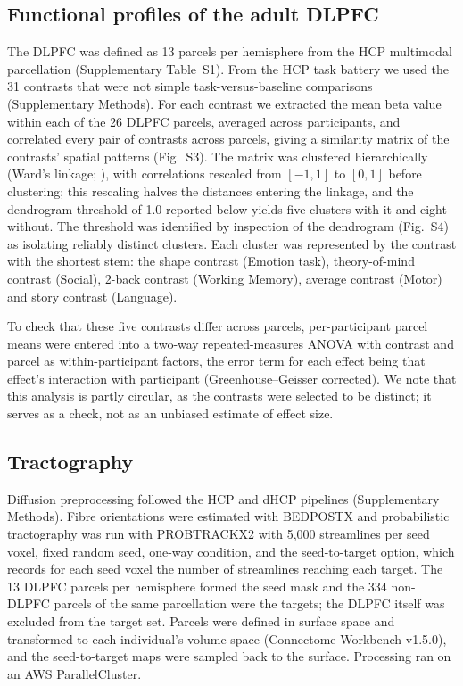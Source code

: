 \documentclass[11pt]{article}
\begin{document}
\subsection{Functional profiles of the adult DLPFC}

The DLPFC was defined as 13 parcels per hemisphere from the HCP multimodal
parcellation \citep{glasser2016} (Supplementary Table~S1). From the HCP task
battery \citep{barch2013} we used the 31 contrasts that were not simple
task-versus-baseline comparisons (Supplementary Methods). For each contrast
we extracted the mean beta value within each of the 26 DLPFC parcels,
averaged across participants, and correlated every pair of contrasts across
parcels, giving a similarity matrix of the contrasts' spatial patterns
(Fig.~S3). The matrix was clustered hierarchically (Ward's linkage;
\citealp{ward1963}), with correlations rescaled from $[-1,1]$ to $[0,1]$
before clustering; this rescaling halves the distances entering the linkage,
and the dendrogram threshold of 1.0 reported below yields five clusters with
it and eight without. The threshold was identified by inspection of the
dendrogram (Fig.~S4) as isolating reliably distinct clusters. Each cluster
was represented by the contrast with the shortest stem: the shape contrast
(Emotion task), theory-of-mind contrast (Social), 2-back contrast (Working
Memory), average contrast (Motor) and story contrast (Language).

To check that these five contrasts differ across parcels, per-participant
parcel means were entered into a two-way repeated-measures ANOVA with
contrast and parcel as within-participant factors, the error term for each
effect being that effect's interaction with participant
(Greenhouse--Geisser corrected). We note that this analysis is partly
circular, as the contrasts were selected to be distinct; it serves as a
check, not as an unbiased estimate of effect size.

\subsection{Tractography}

Diffusion preprocessing followed the HCP and dHCP pipelines (Supplementary
Methods). Fibre orientations were estimated with BEDPOSTX and probabilistic
tractography was run with PROBTRACKX2 \citep{behrens2007} with 5{,}000
streamlines per seed voxel, fixed random seed, one-way condition, and the
seed-to-target option, which records for each seed voxel the number of
streamlines reaching each target. The 13 DLPFC parcels per hemisphere formed
the seed mask and the 334 non-DLPFC parcels of the same parcellation were
the targets; the DLPFC itself was excluded from the target set. Parcels were
defined in surface space and transformed to each individual's volume space
(Connectome Workbench v1.5.0), and the seed-to-target maps were sampled back
to the surface. Processing ran on an AWS ParallelCluster.
\end{document}
